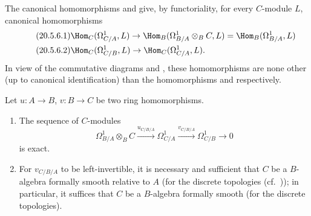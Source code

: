 \begin{env}[20.5.6]
\label{0.20.5.6}
The canonical homomorphisms  and  give, by functoriality, for every $C$-module $L$, canonical homomorphisms
\begin{align}
\tag{20.5.6.1}
  \label{0.20.5.6.1}
  &\Hom_C(\Omega^1_{C/A},L)\to\Hom_B(\Omega^1_{B/A}\otimes_B C,L)=\Hom_B(\Omega^1_{B/A},L) \\
\tag{20.5.6.2}
  \label{0.20.5.6.2}
  &\Hom_C(\Omega^1_{C/B},L)\to\Hom_C(\Omega^1_{C/A},L).
\end{align}
In view of the commutative diagrams  and , these homomorphisms are none other (up to canonical identification) than the homomorphisms  and  respectively.
\end{env}

\begin{theorem}[20.5.7]
\label{0.20.5.7}
Let $u:A\to B$, $v:B\to C$ be two ring homomorphisms.
\begin{enumerate}
  \item[\rm(i)] The sequence of $C$-modules
\begin{equation}
\tag{20.5.7.1}
  \label{0.20.5.7.1}
  \Omega^1_{B/A}\otimes_B C\xrightarrow{u_{C/B/A}}\Omega^1_{C/A}\xrightarrow{v_{C/B/A}}\Omega^1_{C/B}\to 0
\end{equation}
is exact.
  \item[\rm(ii)] For $v_{C/B/A}$ to be left-invertible, it is necessary and sufficient that $C$ be a $B$-algebra formally smooth relative to $A$ \textup{(}for the discrete topologies \textup{(}cf.\ \textup{))}; in particular, it suffices that $C$ be a $B$-algebra formally smooth \textup{(}for the discrete topologies\textup{)}.
\end{enumerate}
\end{theorem}

